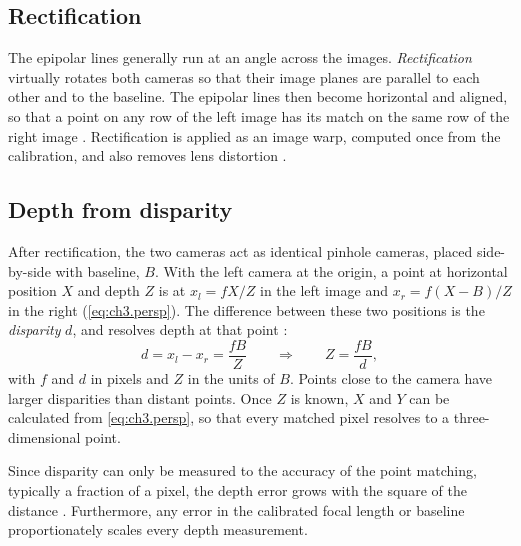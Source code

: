 \subsection{Rectification}
\label{subsec:ch3.rectification}
The epipolar lines generally run at an angle across the images.
 \textit{Rectification} virtually rotates both cameras so that their image planes are
  parallel to each other and to the baseline.
   The epipolar lines then become horizontal and aligned, so that a point on any row of the 
   left image has its match on the same row of the right image \cite{fusielloCompactAlgorithmRectification2000}. 
   Rectification is applied as an image warp, computed once from the calibration, and also removes lens distortion \cite{opencvCameraCalibration3DLink}.

\subsection{Depth from disparity}
\label{subsec:ch3.disparity}
After rectification, the two cameras act as identical pinhole cameras, placed side-by-side with baseline, $B$.
 With the left camera at the origin, a point at horizontal position $X$ and depth $Z$ is at $x_l = fX/Z$ 
 in the left image and $x_r = f(X - B)/Z$ in the right (\autoref{eq:ch3.persp}).
 The difference between these two positions is the \textit{disparity} $d$, and 
 resolves depth at that point \cite{szeliskiComputerVisionAlgorithmsa}:
\begin{equation}
	d = x_l - x_r = \frac{fB}{Z}
	\qquad\Longrightarrow\qquad
	Z = \frac{fB}{d},
	\label{eq:ch3.depth}
\end{equation}
with $f$ and $d$ in pixels and $Z$ in the units of $B$. Points close to the camera
 have larger disparities than distant points. 
 Once $Z$ is known, $X$ and $Y$ can be calculated from \autoref{eq:ch3.persp}, so that every matched pixel
 resolves to a three-dimensional point.

Since disparity can only be measured to the accuracy of the point matching, 
typically a fraction of a pixel, the depth error grows
 with the square of the distance \cite{szeliskiComputerVisionAlgorithmsa}.
 Furthermore, any  error in the calibrated focal length or
 baseline proportionately scales every depth measurement.


